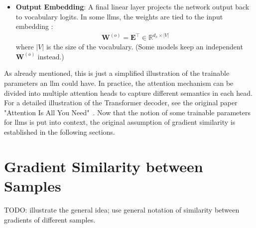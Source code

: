 \begin{itemize}
    \item \textbf{Output Embedding}: A final linear layer projects the network output back to vocabulary logits. In some \acrshort{llm}s, the weights are tied to the input embedding \cite{press2017usingoutputembeddingimprove}:
          \begin{align*}
              \mathbf{W}^{(o)}=\mathbf{E}^{\top}\in\mathbb{R}^{d_x \times |V|}
          \end{align*}
          where $|V|$ is the size of the vocabulary. (Some models keep an independent $\mathbf{W}^{(o)}$ instead.)
\end{itemize}
As already mentioned, this is just a simplified illustration of the trainable parameters an \acrshort{llm} could have. In practice, the attention mechanism can be divided into multiple attention heads to capture different semantics in each head. For a detailed illustration of the Transformer decoder, see the original paper "Attention Is All You Need"~\cite{vaswani2023attentionneed}. Now that the notion of some trainable parameters for \acrlong{llm}s is put into context, the original assumption of gradient similarity is established in the following sections.

\section{Gradient Similarity between Samples}
TODO: illustrate the general idea; use general notation of similarity between gradients of different samples.


